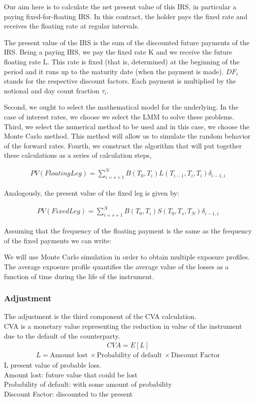 \documentclass[11pt]{article}
\numberwithin{equation}{subsection}
\begin{document}
Our aim here is to calculate the net present value of this IRS, in particular a paying
fixed-for-floating IRS. In this contract, the holder pays the fixed rate and receives the
floating rate at regular intervals.

The present value of the IRS is the sum of the discounted future payments of the IRS.
Being a paying IRS, we pay the fixed rate K and we receive the future floating rate L.
This rate is fixed (that is, determined) at the beginning of the period and it runs up to
the maturity date (when the payment is made). \(DF_{i}\) stands for the respective discount
factors. Each payment is multiplied by the notional and day count fraction \(\tau_{i}\).

Second, we ought to select the mathematical model for the underlying. In the case
of interest rates, we choose we select the LMM to solve these problems. 
Third, we select the numerical method to be used and in this case, we choose the Monte Carlo method. This method will allow
us to simulate the random behavior of the forward rates. Fourth, we construct the
algorithm that will put together these calculations as a series of calculation steps,


\begin{eqnarray*}
	PV(Floating Leg) = \sum_{i=s+1}^{N} B(T_0, T_{i}) L(T_{i-1}, T_{i}, T_{i}) \delta_{i−1,i} 
\end{eqnarray*}

Analogously, the present value of the fixed leg is given by:

\begin{eqnarray*}
	PV(Fixed Leg) = \sum_{i=s+1}^{N} B(T_0, T_{i}) S(T_{0}, T_{s}, T_{N}) \delta_{i−1,i} 
\end{eqnarray*}

Assuming that the frequency of the floating payment is the same as the frequency of the
fixed payments we can write:


We will use Monte Carlo simulation in order to obtain multiple exposure profiles. The average exposure profile quantifies the average value of the losses as a function of time during the life of the instrument.

\subsubsection{Adjustment}
The adjustment is the third component of the CVA calculation. \\
\noindent CVA is a monetary value representing the reduction in value of the instrument due to the default of the counterparty.
\begin{eqnarray}
CVA = E[L]
\end{eqnarray}
\begin{eqnarray}
L = \text{Amount lost} \ \times \text{Probability of default} \ \times \text{Discount Factor}
\end{eqnarray}
L present value of probable loss. \\
Amount lost: future value that could be lost\\
Probability of default:  with some amount of probability\\
Discount Factor: discounted to the present
\end{document}
